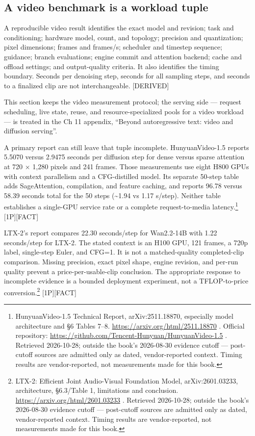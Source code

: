 \subsection{A video benchmark is a workload
tuple}\label{video-benchmark-contract}

A reproducible video result identifies the exact model and revision;
task and conditioning; hardware model, count, and topology; precision
and quantization; pixel dimensions; frames and frames/s; scheduler and
timestep sequence; guidance; branch evaluations; engine commit and
attention backend; cache and offload settings; and output-quality
criteria. It also identifies the timing boundary. Seconds per denoising
step, seconds for all sampling steps, and seconds to a finalized clip
are not interchangeable. \mbox{{[}DERIVED{]}}

This section keeps the video measurement protocol; the serving side ---
request scheduling, live state, reuse, and resource-specialized pools
for a video workload --- is treated in the Ch 11 appendix, ``Beyond
autoregressive text: video and diffusion serving''.

A primary report can still leave that tuple incomplete. HunyuanVideo-1.5
reports 5.5070 versus 2.9475 seconds per diffusion step for dense versus
sparse attention at 720 × 1,280 pixels and 241 frames. Those
measurements use eight H800 GPUs with context parallelism and a
CFG-distilled model. Its separate 50-step table adds SageAttention,
compilation, and feature caching, and reports 96.78 versus 58.39 seconds
total for the 50 steps (\textasciitilde1.94 vs 1.17 s/step). Neither
table establishes a single-GPU service rate or a complete
request-to-media latency.\footnote{HunyuanVideo-1.5 Technical Report,
  arXiv:2511.18870, especially model architecture and §6 Tables 7--8.
  \url{https://arxiv.org/html/2511.18870} . Official repository:
  \url{https://github.com/Tencent-Hunyuan/HunyuanVideo-1.5} . Retrieved
  2026-10-28; outside the book's 2026-08-30 evidence cutoff ---
  post-cutoff sources are admitted only as dated, vendor-reported
  context. Timing results are vendor-reported, not measurements made for
  this book.} \mbox{{[}1P{]}}\hspace{0pt}\mbox{{[}FACT{]}}

LTX-2's report compares 22.30 seconds/step for Wan2.2-14B with 1.22
seconds/step for LTX-2. The stated context is an H100 GPU, 121 frames, a
720p label, single-step Euler, and CFG=1. It is not a matched-quality
completed-clip comparison. Missing precision, exact pixel shape, engine
revision, and per-run quality prevent a price-per-usable-clip
conclusion. The appropriate response to incomplete evidence is a bounded
deployment experiment, not a TFLOP-to-price conversion.\footnote{LTX-2:
  Efficient Joint Audio-Visual Foundation Model, arXiv:2601.03233,
  architecture, §6.3/Table 1, limitations and conclusion.
  \url{https://arxiv.org/html/2601.03233} . Retrieved 2026-10-28; outside the
  book's 2026-08-30 evidence cutoff --- post-cutoff sources are admitted
  only as dated, vendor-reported context. Timing results are
  vendor-reported, not measurements made for this book.}
\mbox{{[}1P{]}}\hspace{0pt}\mbox{{[}FACT{]}}

